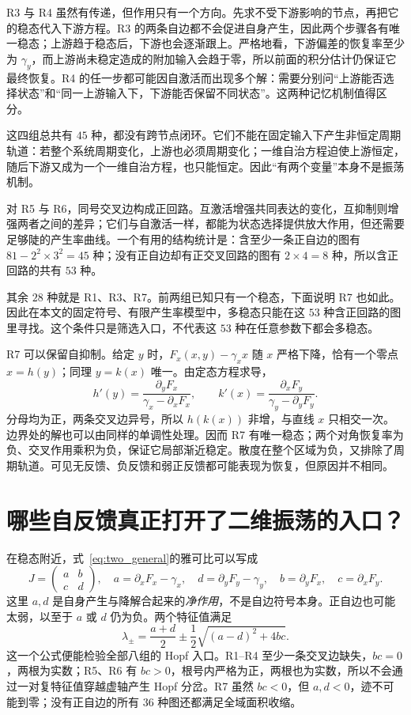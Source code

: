 R3 与 R4 虽然有传递，但作用只有一个方向。先求不受下游影响的节点，再把它的稳态代入下游方程。R3 的两条自边都不会促进自身产生，因此两个步骤各有唯一稳态；上游趋于稳态后，下游也会逐渐跟上。严格地看，下游偏差的恢复率至少为 $\gamma_y$，而上游尚未稳定造成的附加输入会趋于零，所以前面的积分估计仍保证它最终恢复。R4 的任一步都可能因自激活而出现多个解：需要分别问“上游能否选择状态”和“同一上游输入下，下游能否保留不同状态”。这两种记忆机制值得区分。

这四组总共有 $45$ 种，都没有跨节点闭环。它们不能在固定输入下产生非恒定周期轨道：若整个系统周期变化，上游也必须周期变化；一维自治方程迫使上游恒定，随后下游又成为一个一维自治方程，也只能恒定。因此“有两个变量”本身不是振荡机制。

对 R5 与 R6，同号交叉边构成正回路。互激活增强共同表达的变化，互抑制则增强两者之间的差异；它们与自激活一样，都能为状态选择提供放大作用，但还需要足够陡的产生率曲线。一个有用的结构统计是：含至少一条正自边的图有 $81-2^2\times3^2=45$ 种；没有正自边却有正交叉回路的图有 $2\times4=8$ 种，所以含正回路的共有 $53$ 种。

其余 $28$ 种就是 R1、R3、R7。前两组已知只有一个稳态，下面说明 R7 也如此。因此在本文的固定符号、有限产生率模型中，多稳态只能在这 $53$ 种含正回路的图里寻找。这个条件只是筛选入口，不代表这 $53$ 种在任意参数下都会多稳态。

R7 可以保留自抑制。给定 $y$ 时，$F_x(x,y)-\gamma_xx$ 随 $x$ 严格下降，恰有一个零点 $x=h(y)$；同理 $y=k(x)$ 唯一。由定态方程求导，
\[
h'(y)=\frac{\partial_yF_x}{\gamma_x-\partial_xF_x},\qquad
k'(x)=\frac{\partial_xF_y}{\gamma_y-\partial_yF_y}.
\]
分母均为正，两条交叉边异号，所以 $h(k(x))$ 非增，与直线 $x$ 只相交一次。边界处的解也可以由同样的单调性处理。因而 R7 有唯一稳态；两个对角恢复率为负、交叉作用乘积为负，保证它局部渐近稳定。散度在整个区域为负，又排除了周期轨道。可见无反馈、负反馈和弱正反馈都可能表现为恢复，但原因并不相同。

\section{哪些自反馈真正打开了二维振荡的入口？}
在稳态附近，式~\eqref{eq:two_general}的雅可比可以写成
\[
J=\begin{pmatrix}a&b\\c&d\end{pmatrix},\quad
 a=\partial_xF_x-\gamma_x,\quad d=\partial_yF_y-\gamma_y,
\quad b=\partial_yF_x,\quad c=\partial_xF_y.
\]
这里 $a,d$ 是自身产生与降解合起来的\emph{净作用}，不是自边符号本身。正自边也可能太弱，以至于 $a$ 或 $d$ 仍为负。两个特征值满足
\[
\lambda_{\pm}=\frac{a+d}{2}\pm\frac12\sqrt{(a-d)^2+4bc}.
\]
这一个公式便能检验全部八组的 Hopf 入口。R1--R4 至少一条交叉边缺失，$bc=0$，两根为实数；R5、R6 有 $bc>0$，根号内严格为正，两根也为实数，所以不会通过一对复特征值穿越虚轴产生 Hopf 分岔。R7 虽然 $bc<0$，但 $a,d<0$，迹不可能到零；没有正自边的所有 $36$ 种图还都满足全域面积收缩。

